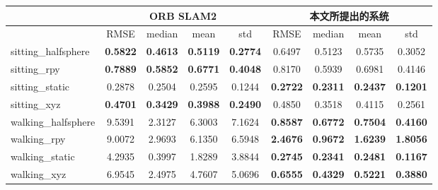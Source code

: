 \begin{table}[!htbp]
    \label{tab:RPER}
    \centering
    \footnotesize%
    \setlength{\tabcolsep}{8pt}%
    \renewcommand{\arraystretch}{1.3}%
    \begin{tabular}{l|cccc|cccc}
        \hline
        & \multicolumn{4}{c|}{ORB SLAM2}                                         & \multicolumn{4}{c}{本文所提出的系统}                                        \\ \hline
        & RMSE            & median          & mean            & std             & RMSE            & median          & mean            & std             \\ \hline
        sitting\_halfsphere & \textbf{0.5822} & \textbf{0.4613} & \textbf{0.5119} & \textbf{0.2774} & 0.6497          & 0.5123          & 0.5735          & 0.3052          \\ \hline
        sitting\_rpy        & \textbf{0.7889} & \textbf{0.5852} & \textbf{0.6771} & \textbf{0.4048} & 0.8170          & 0.5939          & 0.6981          & 0.4146          \\ \hline
        sitting\_static     & 0.2878          & 0.2504          & 0.2595          & 0.1244          & \textbf{0.2722} & \textbf{0.2311} & \textbf{0.2437} & \textbf{0.1201} \\ \hline
        sitting\_xyz        & \textbf{0.4701} & \textbf{0.3429} & \textbf{0.3988} & \textbf{0.2490} & 0.4850          & 0.3518          & 0.4115          & 0.2561          \\ \hline
        walking\_halfsphere & 9.5391          & 2.3127          & 6.3003          & 7.1624          & \textbf{0.8587} & \textbf{0.6772} & \textbf{0.7504} & \textbf{0.4160} \\ \hline
        walking\_rpy        & 9.0072          & 2.9693          & 6.1350          & 6.5948          & \textbf{2.4676} & \textbf{0.9672} & \textbf{1.6239} & \textbf{1.8056} \\ \hline
        walking\_static     & 4.2935          & 0.3997          & 1.8289          & 3.8844          & \textbf{0.2745} & \textbf{0.2341} & \textbf{0.2481} & \textbf{0.1167} \\ \hline
        walking\_xyz        & 6.9545          & 2.4975          & 4.7607          & 5.0696          & \textbf{0.6555} & \textbf{0.4329} & \textbf{0.5221} & \textbf{0.3880} \\ \hline
        \hline
    \end{tabular}
\end{table}
